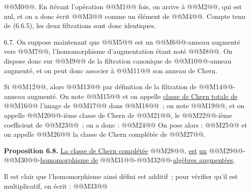 
@@M0@@. En
itérant l'opération @@M1@@ fois, on arrive à @@M2@@, qui est nul, et on a donc écrit @@M3@@ comme un élément de @@M4@@. Compte tenu de (6.6.5), les deux filtrations sont donc identiques.

6.7. On suppose maintenant que @@M5@@ est un @@M6@@-anneau augmenté vers @@M7@@, l'homomorphisme d'augmentation étant noté @@M8@@. On dispose donc sur @@M9@@ de la filtration canonique de @@M10@@-anneau augmenté, et on peut donc associer à @@M11@@ son anneau de Chern.

Si @@M12@@, alors @@M13@@ par définition de la filtration de @@M14@@-anneau augmenté. On note @@M15@@ et on appelle \uline{classe de Chern totale de} @@M16@@ l'image de @@M17@@ dans @@M18@@~; on note @@M19@@, et on appelle @@M20@@-ième classe de Chern de @@M21@@, le @@M22@@-ième coefficient de @@M23@@~; on a donc :
@@M24@@
On pose alors :
@@M25@@
et on appelle @@M26@@ la classe de Chern complétée de @@M27@@.

\textbf{Proposition 6.8.} \uline{La classe de Chern complétée} @@M28@@, \uline{est} \uline{un} @@M29@@-@@M30@@-\uline{homomorphisme de} @@M31@@-@@M32@@-\uline{algèbres augmentées}.

Il est clair que l'homomorphisme ainsi défini est additif~; pour vérifier qu'il est multiplicatif, on écrit :
@@M33@@
